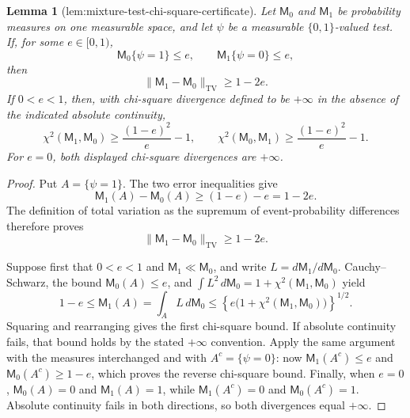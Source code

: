 \documentclass{article}
\newtheorem{lemma}{Lemma}
\begin{document}
\begin{lemma}[lem:mixture-test-chi-square-certificate]\label{lem:mixture-test-chi-square-certificate}
Let \(\mathsf M_0\) and \(\mathsf M_1\) be probability measures on one measurable space, and let \(\psi\) be a measurable \(\{0,1\}\)-valued test.  If, for some \(e\in[0,1)\),
\[
 \mathsf M_0\{\psi=1\}\le e,
 \qquad
 \mathsf M_1\{\psi=0\}\le e,
\]
then
\[
 \|\mathsf M_1-\mathsf M_0\|_{\mathrm{TV}}\ge 1-2e.
\]
If \(0<e<1\), then, with chi-square divergence defined to be \(+\infty\) in the absence of the indicated absolute continuity,
\[
 \chi^2(\mathsf M_1,\mathsf M_0)
 \ge \frac{(1-e)^2}{e}-1,
 \qquad
 \chi^2(\mathsf M_0,\mathsf M_1)
 \ge \frac{(1-e)^2}{e}-1.
\]
For \(e=0\), both displayed chi-square divergences are \(+\infty\).
\end{lemma}
\begin{proof}
Put \(A=\{\psi=1\}\).  The two error inequalities give
\[
 \mathsf M_1(A)-\mathsf M_0(A)
 \ge (1-e)-e=1-2e.
\]
The definition of total variation as the supremum of event-probability differences therefore proves
\[
 \|\mathsf M_1-\mathsf M_0\|_{\mathrm{TV}}\ge1-2e.
\]

Suppose first that \(0<e<1\) and \(\mathsf M_1\ll\mathsf M_0\), and write \(L=d\mathsf M_1/d\mathsf M_0\).  Cauchy--Schwarz, the bound \(\mathsf M_0(A)\le e\), and \(\int L^2\,d\mathsf M_0=1+\chi^2(\mathsf M_1,\mathsf M_0)\) yield
\[
 1-e
 \le \mathsf M_1(A)
 =\int_A L\,d\mathsf M_0
 \le \left\{e\bigl(1+\chi^2(\mathsf M_1,\mathsf M_0)\bigr)\right\}^{1/2}.
\]
Squaring and rearranging gives the first chi-square bound.  If absolute continuity fails, that bound holds by the stated \(+\infty\) convention.  Apply the same argument with the measures interchanged and with \(A^c=\{\psi=0\}\): now \(\mathsf M_1(A^c)\le e\) and \(\mathsf M_0(A^c)\ge1-e\), which proves the reverse chi-square bound.  Finally, when \(e=0\), \(\mathsf M_0(A)=0\) and \(\mathsf M_1(A)=1\), while \(\mathsf M_1(A^c)=0\) and \(\mathsf M_0(A^c)=1\).  Absolute continuity fails in both directions, so both divergences equal \(+\infty\).
\end{proof}
\end{document}
